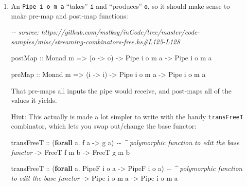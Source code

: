 \documentclass[]{article}
\newenvironment{Shaded}{}{}
\newcommand{\CommentTok}[1]{\textcolor[rgb]{0.38,0.63,0.69}{\textit{#1}}}
\newcommand{\DataTypeTok}[1]{\textcolor[rgb]{0.56,0.13,0.00}{#1}}
\newcommand{\KeywordTok}[1]{\textcolor[rgb]{0.00,0.44,0.13}{\textbf{#1}}}
\newcommand{\NormalTok}[1]{#1}
\newcommand{\OperatorTok}[1]{\textcolor[rgb]{0.40,0.40,0.40}{#1}}
\newcommand{\OtherTok}[1]{\textcolor[rgb]{0.00,0.44,0.13}{#1}}
\begin{document}
\begin{enumerate}
\def\labelenumi{\arabic{enumi}.}
\item
  An \texttt{Pipe\ i\ o\ m\ a} ``takes'' \texttt{i} and ``produces'' \texttt{o},
  so it should make sense to make pre-map and post-map functions:

\begin{Shaded}
\begin{Highlighting}[]
\CommentTok{{-}{-} source: https://github.com/mstksg/inCode/tree/master/code{-}samples/misc/streaming{-}combinators{-}free.hs\#L125{-}L128}

\OtherTok{postMap ::} \DataTypeTok{Monad}\NormalTok{ m }\OtherTok{=>}\NormalTok{ (o }\OtherTok{{-}>}\NormalTok{ o\textquotesingle{}) }\OtherTok{{-}>} \DataTypeTok{Pipe}\NormalTok{ i o m a }\OtherTok{{-}>} \DataTypeTok{Pipe}\NormalTok{ i o\textquotesingle{} m a}

\OtherTok{preMap ::} \DataTypeTok{Monad}\NormalTok{ m }\OtherTok{=>}\NormalTok{ (i\textquotesingle{} }\OtherTok{{-}>}\NormalTok{ i) }\OtherTok{{-}>} \DataTypeTok{Pipe}\NormalTok{ i o m a }\OtherTok{{-}>} \DataTypeTok{Pipe}\NormalTok{ i\textquotesingle{} o m a}
\end{Highlighting}
\end{Shaded}

  That pre-maps all inputs the pipe would receive, and post-maps all of the
  values it yields.

  Hint: This actually is made a lot simpler to write with the handy
  \texttt{transFreeT} combinator, which lets you swap out/change the base
  functor:

\begin{Shaded}
\begin{Highlighting}[]
\NormalTok{transFreeT}
\OtherTok{    ::}\NormalTok{ (}\KeywordTok{forall}\NormalTok{ a}\OperatorTok{.}\NormalTok{ f a }\OtherTok{{-}>}\NormalTok{ g a)     }\CommentTok{{-}{-} \^{} polymorphic function to edit the base functor}
    \OtherTok{{-}>} \DataTypeTok{FreeT}\NormalTok{ f m b}
    \OtherTok{{-}>} \DataTypeTok{FreeT}\NormalTok{ g m b}

\NormalTok{transFreeT}
\OtherTok{    ::}\NormalTok{ (}\KeywordTok{forall}\NormalTok{ a}\OperatorTok{.} \DataTypeTok{PipeF}\NormalTok{ i o a }\OtherTok{{-}>} \DataTypeTok{PipeF}\NormalTok{ i\textquotesingle{} o\textquotesingle{} a)  }\CommentTok{{-}{-} \^{} polymorphic function to edit the base functor}
    \OtherTok{{-}>} \DataTypeTok{Pipe}\NormalTok{ i  o  m a}
    \OtherTok{{-}>} \DataTypeTok{Pipe}\NormalTok{ i\textquotesingle{} o\textquotesingle{} m a}
\end{Highlighting}
\end{Shaded}


\end{enumerate}
\end{document}
